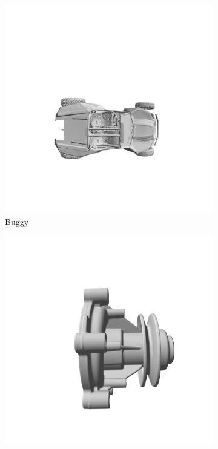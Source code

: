 \documentclass[a4paper,hidelinks,12pt]{article}
\begin{document}
\begin{figure}[ht]
	\centering
	\begin{subfigure}[b]{0.3\textwidth}
			\includegraphics[width=\textwidth]{buggy.png}
			\caption{Buggy}
			\label{fig:img1}
	\end{subfigure}
	\hfill
	\begin{subfigure}[b]{0.3\textwidth}
			\includegraphics[width=\textwidth]{waterpump.png}

\end{subfigure}
\end{figure}
\end{document}
